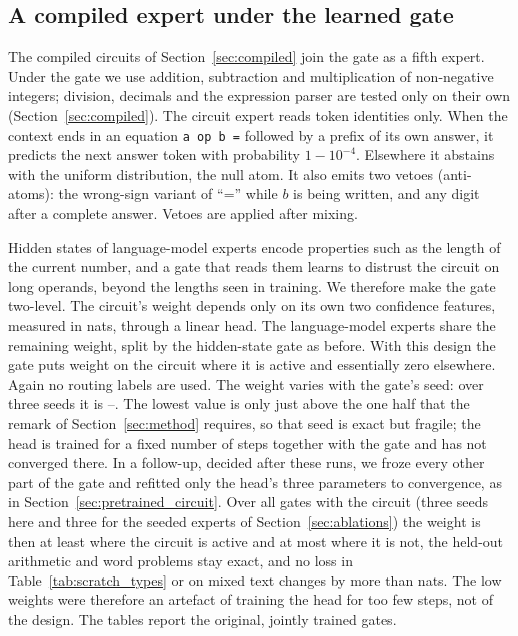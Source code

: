 \documentclass[10pt]{article}
\begin{document}
\subsection{A compiled expert under the learned gate}
\label{sec:scratch_circuit}

The compiled circuits of Section~\ref{sec:compiled} join the gate as a fifth expert. Under the
gate we use addition, subtraction and multiplication of non-negative integers; division,
decimals and the expression parser are tested only on their own (Section~\ref{sec:compiled}).
The circuit expert reads token identities only. When the context ends in an equation \texttt{a op b =}
followed by a prefix of its own answer, it predicts the next answer token with probability
$1-10^{-4}$. Elsewhere it abstains with the uniform distribution, the null atom. It also emits
two vetoes (anti-atoms): the wrong-sign variant of ``='' while $b$ is being written, and any
digit after a complete answer. Vetoes are applied after mixing.

Hidden states of language-model experts encode properties such as the length of the current
number, and a gate that reads them learns to distrust the circuit on long operands, beyond the
lengths seen in training. We therefore make the gate two-level. The circuit's weight depends only
on its own two confidence features, measured in nats, through a linear head. The language-model
experts share the remaining weight, split by the hidden-state gate as before. With this design
the gate puts weight \resTrackCCircuitLambdaActive{} on the circuit where it is active and
essentially zero elsewhere. Again no routing labels are used. The weight varies with the gate's
seed: over three seeds it is \resTrackCCircuitLambdaMin--\resTrackCCircuitLambdaMax{}. The
lowest value is only just above the one half that the remark of Section~\ref{sec:method}
requires, so that seed is exact but fragile; the head is trained for a fixed number of steps
together with the gate and has not converged there. In a follow-up, decided after these runs,
we froze every other part of the gate and refitted only the head's three parameters to
convergence, as in Section~\ref{sec:pretrained_circuit}. Over all \resTrackCRefitGates{} gates
with the circuit (three seeds here and three for the seeded experts of
Section~\ref{sec:ablations}) the weight is then at least \resTrackCRefitLambdaMin{} where the
circuit is active and at most \resTrackCRefitLambdaOffMax{} where it is not, the held-out
arithmetic and word problems stay exact, and no loss in Table~\ref{tab:scratch_types} or on
mixed text changes by more than \resTrackCRefitLossChangeMax{} nats. The low weights were
therefore an artefact of training the head for too few steps, not of the design. The tables
report the original, jointly trained gates.
\end{document}
